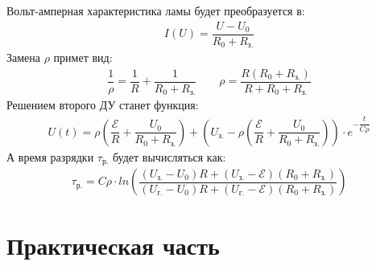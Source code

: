 \documentclass[a4paper, usenames, dvipsnames]{article}
\begin{document}
Вольт-амперная характеристика ламы будет преобразуется в:
\begin{gather*}
    I(U) = \dfrac{U - U_0}{R_0 + R_\text{з.}}
\end{gather*}
Замена $\rho$ примет вид:
\begin{gather*}
    \dfrac{1}{\rho} = \dfrac{1}{R} + \dfrac{1}{R_0 + R_\text{з.}} \hspace{2em} \rho = \dfrac{R(R_0 + R_\text{з.})}{R + R_0 + R_\text{з.}}
\end{gather*}
Решением второго ДУ станет функция:
\begin{gather*}
    U(t) = \rho \left(\dfrac{\mathcal{E}}{R} + \dfrac{U_0}{R_0 + R_\text{з.}}\right)
    + \left(U_\text{з.} - \rho \left(\dfrac{\mathcal{E}}{R} + \dfrac{U_0}{R_0 + R_\text{з.}}\right)\right)
    \cdot e^{-\dfrac{t}{C \rho}}
\end{gather*}
А время разрядки $\tau_\text{р.}$ будет вычисляться как:
\begin{gather*}
    \tau_\text{р.} = C \rho \cdot ln\left(\dfrac{(U_\text{з.} - U_0)R + (U_\text{з.}
            - \mathcal{E})(R_0 + R_\text{з.})}{(U_\text{г.} - U_0)R + (U_\text{г.} - \mathcal{E})(R_0 + R_\text{з.})}\right)
\end{gather*}

\section*{\centering Практическая часть}
\end{document}
